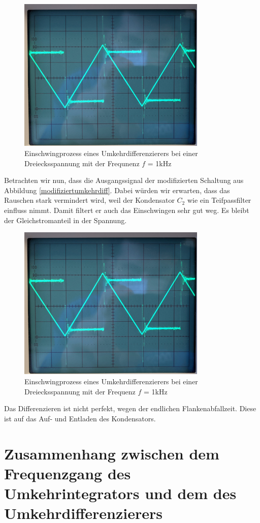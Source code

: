 \begin{figure}[h]
    \centering
    \includegraphics[width = 9cm]{Bilder/43-diffSchwingung.jpg}
    \caption{Einschwingprozess eines Umkehrdifferenzierers bei einer Dreiecksspannung mit der Frequnenz $f$ = 1kHz }
    \label{Einschwingprozess}
\end{figure}

Betrachten wir nun, dass die Ausgangssignal der modifizierten Schaltung aus Abbildung \ref{modifiziertumkehrdiff}. Dabei würden 
wir erwarten, dass das Rauschen stark vermindert wird, weil der Kondensator $C_2$ wie ein Teifpassfilter einfluss nimmt. Damit filtert er auch 
das Einschwingen sehr gut weg. Es bleibt der Gleichstromanteil in der Spannung.
\begin{figure}[h]
    \centering
    \includegraphics[width = 9cm]{Bilder/43-diffSchwingung.jpg}
    \caption{Einschwingprozess eines Umkehrdifferenzierers bei einer Dreiecksspannung mit der Frequenz $f$ = 1kHz }
    \label{Einschwingprozess}
\end{figure}
Das Differenzieren ist nicht perfekt, wegen der endlichen Flankenabfallzeit. Diese ist auf das Auf- und Entladen des Kondensators.
\section*{Zusammenhang zwischen dem Frequenzgang des Umkehrintegrators und dem des Umkehrdifferenzierers}
